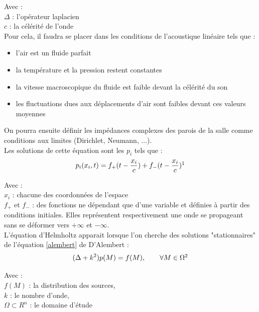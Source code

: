 Avec : \\
$\Delta$ : l'opérateur laplacien\\
$c$ : la célérité de l'onde\\

Pour cela, il faudra se placer dans les conditions de l'acoustique linéaire tels que \cite[p. 19]{jot}:

\begin{itemize}
\item l'air est un fluide parfait
\item la température et la pression restent constantes
\item la vitesse macroscopique du fluide est faible devant la célérité du son
\item les fluctuations dues aux déplacements d'air sont faibles devant ces valeurs moyennes
\end{itemize}



On pourra ensuite définir les impédances complexes des parois de la salle comme conditions aux limites (\gls{Dirichlet}, \gls{Neumann}, ...). \\

Les solutions de cette équation sont les $p_i$ tels que :
\begin{equation}
p_i(x_i,t) = f_+(t-\frac{x_i}{c}) + f_-(t-\frac{x_i}{c})
\footnotemark
\end{equation}

Avec : \\
$x_i$ : chacune des coordonnées de l'espace\\
$ f_+$ et  $f_-$ : des fonctions ne dépendant que d'une variable et définies à partir des conditions initiales. Elles représentent respectivement une onde se propageant sans se déformer vers $+\infty$ et $-\infty$.\\

L'équation d'Helmholtz apparait lorsque l'on cherche des solutions "stationnaires" de l'équation \ref{alembert} de D'Alembert :
\begin{equation} \label{helmoltz}
(\Delta + k^2)p(M) = f(M),	 	\qquad  \forall M  \in \Omega
\footnotemark
\end{equation}

Avec : \\
$f(M)$ : la distribution des sources, \\
$k$ : le nombre d'onde, \\
$\Omega  \subset R^n$ : le domaine d'étude\\

